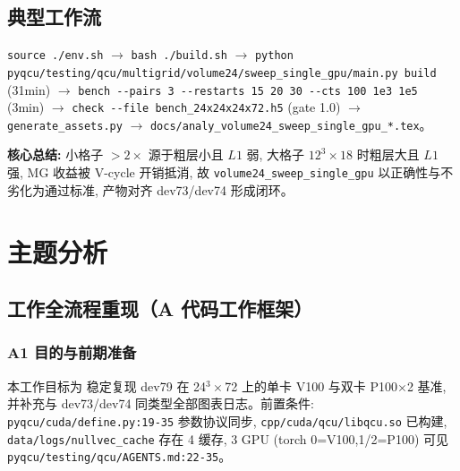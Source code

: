\documentclass[UTF8]{ctexart}
\begin{document}
\subsection{典型工作流}
\texttt{\nolinkurl{source ./env.sh}} $\to$ \texttt{\nolinkurl{bash ./build.sh}} $\to$ \texttt{\nolinkurl{python pyqcu/testing/qcu/multigrid/volume24/sweep_single_gpu/main.py build}} (31min) $\to$ \texttt{\nolinkurl{bench --pairs 3 --restarts 15 20 30 --cts 100 1e3 1e5}} (3min) $\to$ \texttt{\nolinkurl{check --file bench_24x24x24x72.h5}} (gate 1.0) $\to$ \texttt{\nolinkurl{generate_assets.py}} $\to$ \texttt{\nolinkurl{docs/analy_volume24_sweep_single_gpu_*.tex}}。

\begin{ideabox}
\textbf{核心总结:} 小格子 $>2\times$ 源于粗层小且 $L1$ 弱, 大格子 $12^3\times18$ 时粗层大且 $L1$ 强, MG 收益被 V-cycle 开销抵消, 故 \texttt{\nolinkurl{volume24_sweep_single_gpu}} 以正确性与不劣化为通过标准, 产物对齐 dev73/dev74 形成闭环。
\end{ideabox}

\section{主题分析}
\subsection{工作全流程重现（A 代码工作框架）}

\subsubsection{A1 目的与前期准备}
本工作目标为 \textcolor{struct}{稳定复现 dev79 在 24$^3\times$72 上的单卡 V100 与双卡 P100$\times$2 基准, 并补充与 dev73/dev74 同类型全部图表日志}。前置条件: \texttt{\nolinkurl{pyqcu/cuda/define.py:19-35}} 参数协议同步, \texttt{\nolinkurl{cpp/cuda/qcu/libqcu.so}} 已构建, \texttt{\nolinkurl{data/logs/nullvec_cache}} 存在 4 缓存, 3 GPU (torch 0=V100,1/2=P100) 可见 \textcolor{evidence}{\texttt{\nolinkurl{pyqcu/testing/qcu/AGENTS.md:22-35}}}。
\end{document}
